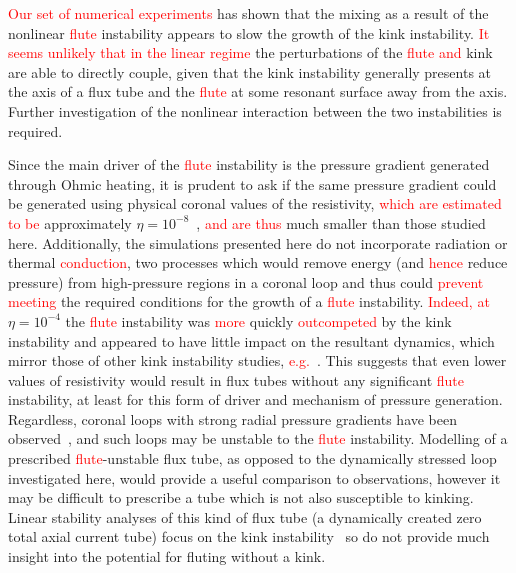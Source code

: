 \documentclass[12pt]{article}
\newcommand{\rs}[2]{\textcolor{red}{#2}}
\begin{document}
\rs{This set of experiments}{Our set of numerical experiments} has
shown that the mixing as a result of the nonlinear \rs{fluting}{flute}
instability appears to slow the growth of the kink instability. \rs{In
  the linear regime it seems unlikely that}{It seems unlikely that in
  the linear regime} the \rs{linear}{} perturbations of \rs{either}{} the
\rs{fluting}{flute} \rs{or}{and} kink are able to directly couple, given that
the kink instability generally presents at the axis of a flux tube and
the \rs{fluting}{flute} at some resonant surface away from the
axis. Further investigation of the nonlinear interaction between the
two instabilities is required. 

Since the main driver of the \rs{fluting}{flute} instability is the
pressure gradient generated through Ohmic heating, it is prudent to
ask if the same pressure gradient could be generated using physical
coronal values of the resistivity, \rs{of}{which are estimated to be}
approximately
$\eta=10^{-8}$~\cite{craigAnisotropicViscousDissipation2009a},
\rs{which are}{and are thus} much smaller than those studied
here. Additionally, the simulations presented here do not incorporate
radiation or thermal \rs{conductivity}{conduction}, two processes which would remove
energy (and \rs{thus}{hence} reduce pressure) from high-pressure regions in a coronal
loop and thus could \rs{remove}{prevent meeting} the required
conditions for the growth of a 
\rs{fluting}{flute} instability. \rs{Where}{Indeed, at} $\eta=10^{-4}$ the
\rs{fluting}{flute} instability was \rs{}{more} quickly \rs{dominated}{outcompeted} by the kink
instability and appeared to have little impact on the resultant
dynamics, which mirror those of other kink instability studies, \rs{such
as~}{e.g.~}\cite{hoodCoronalHeatingMagnetic2009}. This suggests that even
lower values of resistivity would result in flux tubes without any
significant \rs{fluting}{flute} instability, at least for this form of
driver and mechanism of pressure generation. Regardless, coronal loops
with strong radial pressure gradients have been
observed~\cite{foukalTemperatureStructurePressure1975}, and such loops
may be unstable to the \rs{fluting}{flute} instability. Modelling of a
prescribed \rs{fluting}{flute}-unstable flux tube, as opposed to the dynamically
stressed loop investigated here, would provide a useful comparison to
observations, however it may be difficult to prescribe a tube which is
not also susceptible to kinking. Linear stability analyses of this
kind of flux tube (a dynamically created zero total axial current
tube) focus on the kink
instability~\cite{browningSolarCoronalHeating2003c} so do not provide
much insight into the potential for fluting without a kink. 
\end{document}
